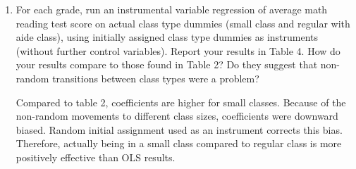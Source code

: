 \documentclass{article}
\begin{document}
\begin{enumerate}[label=\alph*]
\item For each grade, run an instrumental variable regression of average math reading test score on actual class type dummies (small class and regular with aide class), using initially assigned class type dummies as instruments (without further control variables). Report your results in Table 4. How do your results compare to those found in Table 2? Do they suggest that non-random transitions between class types were a problem?




Compared to table 2, coefficients are higher for small classes. Because of the non-random movements to different class sizes, coefficients were downward biased. Random initial assignment used as an instrument corrects this bias. Therefore, actually being in a small class compared to regular class is more positively effective than OLS results.


\end{enumerate}
\end{document}
